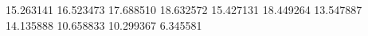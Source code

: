 15.263141
16.523473
17.688510
18.632572
15.427131
18.449264
13.547887
14.135888
10.658833
10.299367
6.345581
